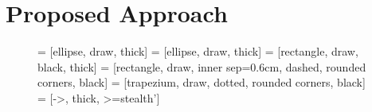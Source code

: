 
\section{Proposed Approach}

\begin{figure}
   = [ellipse, draw, thick]%
   = [ellipse, draw, thick]
   = [rectangle, draw, black, thick]%
   = [rectangle, draw, inner sep=0.6cm, dashed, rounded corners, black]
   = [trapezium, draw, dotted, rounded corners, black]
   = [->, thick, >=stealth']%

\end{figure}
